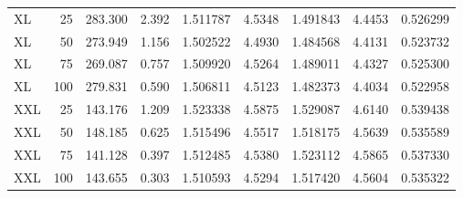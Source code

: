 \begin{table}[t]
\begin{tabular}{lrrrrrrrr}
\addlinespace[3pt]
XL & 25 & 283.300 & 2.392 & 1.511787 & 4.5348 & 1.491843 & 4.4453 & 0.526299\\
XL & 50 & 273.949 & 1.156 & 1.502522 & 4.4930 & 1.484568 & 4.4131 & 0.523732\\
XL & 75 & 269.087 & 0.757 & 1.509920 & 4.5264 & 1.489011 & 4.4327 & 0.525300\\
XL & 100 & 279.831 & 0.590 & 1.506811 & 4.5123 & 1.482373 & 4.4034 & 0.522958\\
\addlinespace[3pt]
XXL & 25 & 143.176 & 1.209 & 1.523338 & 4.5875 & 1.529087 & 4.6140 & 0.539438\\
XXL & 50 & 148.185 & 0.625 & 1.515496 & 4.5517 & 1.518175 & 4.5639 & 0.535589\\
XXL & 75 & 141.128 & 0.397 & 1.512485 & 4.5380 & 1.523112 & 4.5865 & 0.537330\\
XXL & 100 & 143.655 & 0.303 & 1.510593 & 4.5294 & 1.517420 & 4.5604 & 0.535322\\
\bottomrule
\end{tabular}
\end{table}
